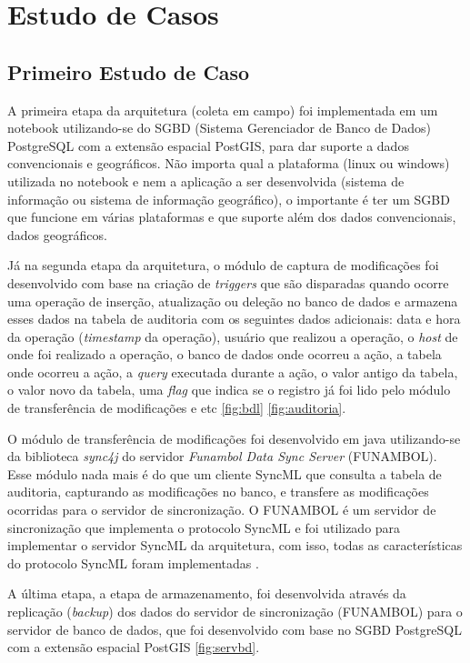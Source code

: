 \chapter{Estudo de Casos}

\section{Primeiro Estudo de Caso}

A primeira etapa da arquitetura (coleta em campo) foi implementada em um notebook utilizando-se do SGBD (Sistema Gerenciador de Banco de Dados) PostgreSQL com a extensão espacial PostGIS, para dar suporte a dados convencionais e geográficos. Não importa qual a plataforma (linux ou windows) utilizada no notebook e nem a aplicação a ser desenvolvida (sistema de informação ou sistema de informação geográfico), o importante é ter um SGBD que funcione em várias plataformas e que suporte além dos dados convencionais, dados geográficos.
 
Já na segunda etapa da arquitetura, o módulo de captura de modificações foi desenvolvido com base na criação de \textit{triggers} que são disparadas quando ocorre uma operação de inserção, atualização ou deleção no banco de dados e armazena esses dados na tabela de auditoria com os seguintes dados adicionais: data e hora da operação (\textit{timestamp} da operação), usuário que realizou a operação, o \textit{host} de onde foi realizado a operação, o banco de dados onde ocorreu a ação, a tabela onde ocorreu a ação, a \textit{query} executada durante a ação, o valor antigo da tabela, o valor novo da tabela, uma \textit{flag} que indica se o registro já foi lido pelo módulo de transferência de modificações e etc \ref{fig:bdl} \ref{fig:auditoria}.

O módulo de transferência de modificações foi desenvolvido em java utilizando-se da biblioteca \textit{sync4j} do servidor \textit{Funambol Data Sync Server} (FUNAMBOL). Esse módulo nada mais é do que um cliente SyncML que consulta a tabela de auditoria, capturando as modificações no banco, e transfere as modificações ocorridas para o servidor de sincronização. O FUNAMBOL é um servidor de sincronização que implementa o protocolo SyncML e foi utilizado para implementar o servidor SyncML da arquitetura, com isso, todas as características do protocolo SyncML foram implementadas \cite{alonso}.

A última etapa, a etapa de armazenamento, foi desenvolvida através da replicação (\textit{backup}) dos dados do servidor de sincronização (FUNAMBOL) para o servidor de banco de dados, que foi desenvolvido com base no SGBD PostgreSQL com a extensão espacial PostGIS \ref{fig:servbd}.

